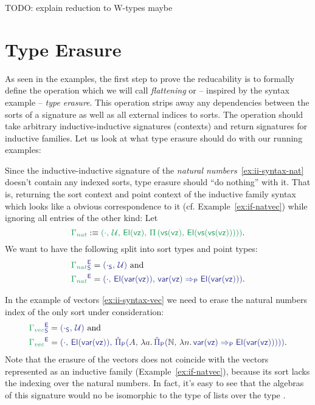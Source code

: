 TODO: explain reduction to W-types maybe

\section{Type Erasure}

As seen in the examples, the first step to prove the reducability is to formally
define the operation which we will call \emph{flattening} or -- inspired by
the syntax example -- \emph{type erasure}.
This operation strips away any dependencies between the sorts of a signature
as well as all external indices to sorts.
The operation should take arbitrary inductive-inductive signatures (contexts) and
return signatures for inductive families.
Let us look at what type erasure should do with our running examples:

\begin{example}\label{ex:red-e-nat}
Since the inductive-inductive signature of the \emph{natural numbers}~\ref{ex:ii-syntax-nat} doesn't
contain any indexed sorts, type erasure should ``do nothing'' with it.
That is, returning the sort context and point context of the inductive family
syntax which looks like a obvious correspondence to it (cf. Example~\ref{ex:if-natvec})
while ignoring all entries of the other kind:
Let
\begin{equation*}
\grm{\Gamma_{nat}} 
  :\equiv \grm{(\cdot,\, \UU,\, \El(\vz),\, \Pi\left(\vs(\vz),\, \El(\vs(\vs(\vz)))\right))}
  \text{.}
\end{equation*}
We want to have the following split into sort types and point types:
\begin{align*}
\tqm{\grm{\Gamma_{nat}}^\EE_\Sc}
 &= \tqm{(\cdot_\Sc,\, \UU)} \text{ and} \\
\tqm{\grm{\Gamma_{nat}}^\EE}
 &= \tqm{(\cdot,\, \El(\var(\vz)),\, \var(\vz) \Rightarrow_\Pc \El(\var(\vz)))} \text{.}
\end{align*}
\end{example}

\begin{example}[Vectors]\label{ex:red-e-vec}
In the example of vectors \ref{ex:ii-syntax-vec} we need to erase the natural numbers
index of the only sort under consideration:
\begin{align*}
\tqm{\grm{\Gamma_{vec}}^\EE_\Sc}
 &= \tqm{(\cdot_\Sc,\, \UU)} \text{ and} \\
\tqm{\grm{\Gamma_{vec}}^\EE}
  &= \tqm{(\cdot,\, \El(\var(\vz)),\, 
    \ExtPiP{A}{\blm{\lambda a.\,}\ExtPiP{\N}{\blm{\lambda n.\,}
    \var(\vz) \Rightarrow_\Pc \El(\var(\vz))}})} \text{.}
\end{align*}
Note that the erasure of the vectors does not coincide with the vectors represented
as an inductive family (Example~\ref{ex:if-natvec}), because its sort lacks the
indexing over the natural numbers.
In fact, it's easy to see that the algebras of this signature would no be isomorphic
to the type of lists over the type .
\end{example}

